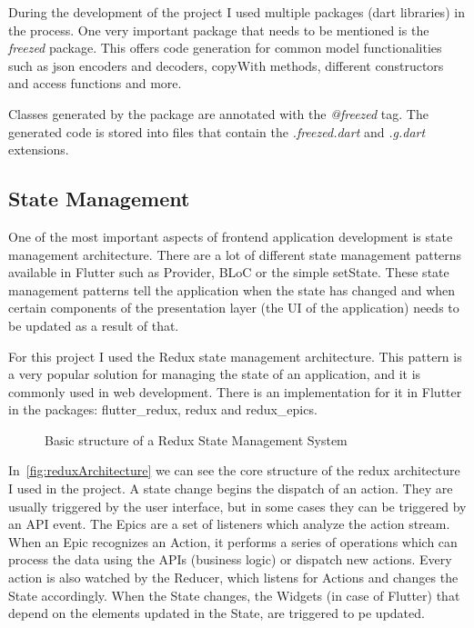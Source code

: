 \documentclass[a4paper,12pt]{report}
\begin{document}
During the development of the project I used multiple packages (dart libraries)
in the process. One very important package that needs to be mentioned is the
\textit{freezed} package\cite{freezedDocs}. This offers code generation for
common model functionalities such as json encoders and decoders, copyWith
methods, different constructors and access functions and more.

Classes generated by the package are annotated with the \textit{@freezed} tag.
The generated code is stored into files that contain the \textit{.freezed.dart}
and \textit{.g.dart} extensions.

\subsection{State Management}

One of the most important aspects of frontend application development is state
management architecture. There are a lot of different state management patterns
available in Flutter\cite{flutterStateManagement} such as Provider, BLoC or the
simple setState. These state management patterns tell the application when the
state has changed and when certain components of the presentation layer (the UI
of the application) needs to be updated as a result of that.

For this project I used the Redux state management architecture. This pattern
is a very popular solution for managing the state of an application, and it is
commonly used in web development. There is an implementation for it in Flutter
in the packages: flutter\_redux\cite{flutterReduxDocs}, redux\cite{reduxDocs}
and redux\_epics\cite{reduxEpicsDocs}.

\begin{figure}[H]
    \centering
    \scalebox{0.75}{}
    \caption{Basic structure of a Redux State Management System}\label{fig:reduxArchitecture}
\end{figure}

In~\autoref{fig:reduxArchitecture} we can see the core structure of the redux
architecture I used in the project. A state change begins the dispatch of an
action. They are usually triggered by the user interface, but in some cases
they can be triggered by an API event. The Epics are a set of listeners which
analyze the action stream. When an Epic recognizes an Action, it performs a
series of operations which can process the data using the APIs (business logic)
or dispatch new actions. Every action is also watched by the Reducer, which
listens for Actions and changes the State accordingly. When the State changes,
the Widgets (in case of Flutter) that depend on the elements updated in the
State, are triggered to pe updated.
\end{document}
